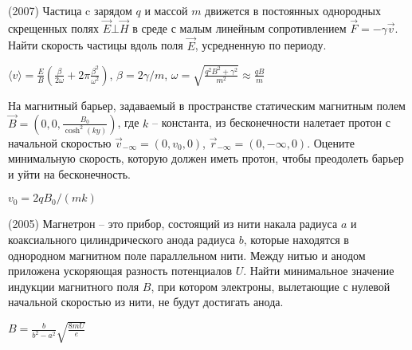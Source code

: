\begin{ex}
(2007) Частица c зарядом $q$ и массой $m$ движется в постоянных однородных скрещенных полях $\vec{E} \bot \vec{H}$ в среде с малым линейным сопротивлением $\vec{F} = -\gamma \vec{v}$. Найти скорость частицы вдоль поля $\vec{E}$, усредненную по периоду.
\begin{ans}
$\langle v \rangle = \frac{E}{B}\left(\frac{\beta}{2\omega} + 2\pi \frac{\beta^2}{\omega^2} \right)$, $\beta = 2\gamma/m$, $\omega = \sqrt{\frac{q^2B^2+\gamma^2}{m^2}} \approx \frac{qB}{m}$
\end{ans}
\end{ex}

\begin{ex}
На магнитный барьер, задаваемый в пространстве статическим магнитным полем $\vec{B} = \left(0, 0, \frac{B_0}{\cosh^2(ky)}\right)$, где $k$ -- константа, из бесконечности налетает протон с начальной скоростью $\vec{v}_{-\infty} = (0, v_0, 0)$, $\vec{r}_{-\infty} = (0, -\infty, 0)$. Оцените минимальную скорость, которую должен иметь протон, чтобы преодолеть барьер и уйти на бесконечность. 
\begin{ans}
$v_0 = 2qB_0/(mk)$
\end{ans}
\end{ex}

\begin{ex}
(2005)  Магнетрон -- это прибор, состоящий из нити накала радиуса $a$ и коаксиального цилиндрического анода радиуса $b$, которые находятся в однородном магнитном поле параллельном нити. Между нитью и анодом приложена ускоряющая разность потенциалов $U$. Найти минимальное значение индукции магнитного поля $B$, при котором электроны, вылетающие с нулевой начальной скоростью из нити, не будут достигать анода.
\begin{ans}
$B=\frac{b}{b^2-a^2}\sqrt{\frac{8mU}{e}}$
\end{ans}
\end{ex}